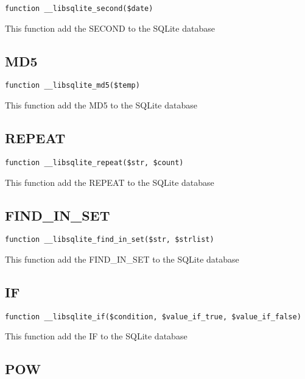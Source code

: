 \documentclass[a4paper]{book}
\begin{document}
\begin{lstlisting}
function __libsqlite_second($date)
\end{lstlisting}

This function add the SECOND to the SQLite database

\hypertarget{toc325}{}
\subsection{MD5}

\begin{lstlisting}
function __libsqlite_md5($temp)
\end{lstlisting}

This function add the MD5 to the SQLite database

\hypertarget{toc326}{}
\subsection{REPEAT}

\begin{lstlisting}
function __libsqlite_repeat($str, $count)
\end{lstlisting}

This function add the REPEAT to the SQLite database

\hypertarget{toc327}{}
\subsection{FIND\_IN\_SET}

\begin{lstlisting}
function __libsqlite_find_in_set($str, $strlist)
\end{lstlisting}

This function add the FIND\_IN\_SET to the SQLite database

\hypertarget{toc328}{}
\subsection{IF}

\begin{lstlisting}
function __libsqlite_if($condition, $value_if_true, $value_if_false)
\end{lstlisting}

This function add the IF to the SQLite database

\hypertarget{toc329}{}
\subsection{POW}
\end{document}
